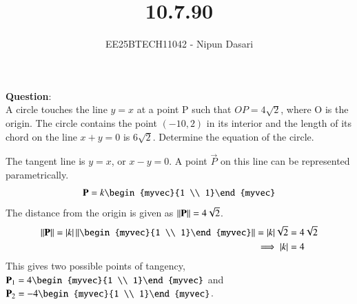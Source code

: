 \documentclass[journal]{IEEEtran}
\begin{document}
	
	
	\vspace{3cm}
	
	\title{10.7.90}
	\author{EE25BTECH11042 - Nipun Dasari}
	\maketitle
	
	\renewcommand{\thefigure}{\theenumi}
	\renewcommand{\thetable}{\theenumi}
	\setlength{\intextsep}{10pt}
	
	\renewcommand{\thetable}{\theenumi}
	
	\textbf{Question}:\\
	A circle touches the line $y=x$ at a point P such that $OP=4\sqrt{2}$, where O is the origin. The circle contains the point $(-10,2)$ in its interior and the length of its chord on the line $x+y=0$ is $6\sqrt{2}$. Determine the equation of the circle.
	
	\solution
	
	The tangent line is $y=x$, or $x-y=0$. A point $\vec{P}$ on this line can be represented parametrically.
	\begin{align}
		\vec{P} = k\begin{myvec}{1 \\ 1}\end{myvec}
	\end{align}
	The distance from the origin is given as $\left\lVert\mathbf{P}\right\rVert = 4\sqrt{2}$.
	\begin{align}
		\norm{\vec{P}} = |k|\norm{\begin{myvec}{1 \\ 1}\end{myvec}} = |k|\sqrt{2} &= 4\sqrt{2} \nonumber \\
		\implies |k| &= 4
	\end{align}
	This gives two possible points of tangency, $\vec{P}_1=4\begin{myvec}{1 \\ 1}\end{myvec}$ and $\vec{P}_2=-4\begin{myvec}{1 \\ 1}\end{myvec}$.
	
\end{document}
